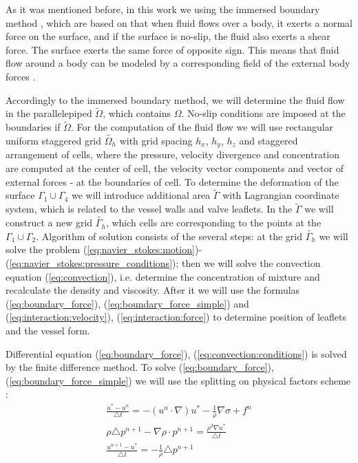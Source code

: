 \documentclass[runningheads,a4paper]{llncs}
\begin{document}
As it was mentioned before, in this work we using the immersed boundary method \cite{pescin_1977}, which are based on that when fluid flows over a body,
it exerts a normal force on the surface, and if the surface is no-slip, the fluid also exerts a shear force. The surface exerts the same force of opposite sign.
This means that fluid flow around a body can be modeled by a corresponding field of the external body forces \cite{goldstain}.

Accordingly to the immersed boundary method, we will determine the fluid flow in the parallelepiped $\tilde{\Omega}$, which contains $\Omega$.
No-slip conditions are imposed at the boundaries if $\tilde{\Omega}$.
For the computation of the fluid flow we will use rectangular uniform staggered grid $\tilde{\Omega_h}$ with grid spacing $h_x$, $h_y$, $h_z$ and 
staggered arrangement of cells, where the pressure, velocity divergence and concentration are computed at the center of cell, the velocity vector components
and vector of external forces - at the boundaries of cell. To determine the deformation of the surface $\Gamma_1 \cup \Gamma_4$ we will introduce additional
area $\tilde{\Gamma}$ with Lagrangian coordinate system, which is related to the vessel walls and valve leaflets. In the $\tilde{\Gamma}$ we will construct
a new grid $\tilde{\Gamma_h}$, which cells are corresponding to the points at the $\Gamma_1 \cup \Gamma_2$. Algorithm of solution consists of the several steps:
at the grid $\tilde{\Gamma_h}$ we will solve the problem (\ref{eq:navier_stokes:motion})-(\ref{eq:navier_stokes:pressure_conditions}); then we will solve
the convection equation (\ref{eq:convection}), i.e. determine the concentration of mixture and recalculate the density and viscosity. After it we will use
the formulas (\ref{eq:boundary_force}), (\ref{eq:boundary_force_simple}) and (\ref{eq:interaction:velocity}), (\ref{eq:interaction:force}) to determine position of
leaflets and the vessel form.

Differential equation (\ref{eq:boundary_force}), (\ref{eq:convection:conditions}) is solved by the finite difference method.
To solve (\ref{eq:boundary_force}), (\ref{eq:boundary_force_simple}) we will use the splitting on physical factors scheme \cite{belotserkovsky}:
\begin{gather}
    \label{eq:splitting:intermediate_velocity}
    \frac{u^* - u^n}{\triangle t} = - (u^n \cdot \nabla) u^* - \frac{1}{\rho} \nabla \sigma + f^n\\
    \label{eq:splitting:poisson}
    \rho \triangle p^{n+1} - \nabla \rho \cdot p^{n+1} = \frac{\rho^2 \nabla u^*}{\triangle t}\\
    \label{eq:splitting:velocity}
    \frac{u^{n+1} - u^*}{\triangle t} = - \frac{1}{\rho} \triangle p^{n+1}
\end{gather}
\end{document}
